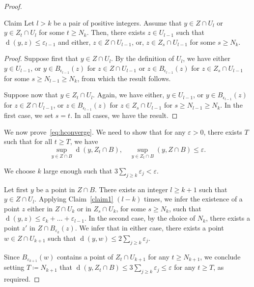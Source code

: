 \documentclass[AHL,Unicode,longabstracts]{cedram}
\DeclareMathOperator{\dist}{d}
\begin{document}
\begin{proof}
\begin{enonce}
{Claim } \label{claim1}
Let $l>k$ be a pair of positive integers. Assume that $y \in Z\cap U_l$ or $y\in Z_t \cap U_l$ for some $t \geq N_k$. Then, there exists $z \in U_{l-1}$ such that $\dist(y, z) \leq \varepsilon_{l-1}$ and either, $z \in Z \cap U_{l-1}$, or, $z \in Z_s \cap U_{l-1}$ for some $s\geq N_k$.
\end{enonce}

\begin{proof}
Suppose first that $y \in Z\cap U_l$. By the definition of $U_l$, we have either $y\in U_{l-1}$, or $y \in B_{\epsilon_{l-1}}(z)$ for $z\in Z\cap U_{l-1}$ or $z \in B_{\epsilon_{l-1}}(z)$ for $z \in Z_s\cap U_{l-1}$ for some $s\geq N_{l-1} \geq N_k$, from which the result follows.

Suppose now that $y \in Z_t\cap U_l$. Again, we have either, $y\in U_{l-1}$, or $y \in B_{\epsilon_{l-1}}(z)$ for $z\in Z\cap U_{l-1}$, or $z \in B_{\epsilon_{l-1}}(z)$ for $z \in Z_s\cap U_{l-1}$ for $s\geq N_{l-1} \geq N_k$. In the first case, we set $s=t$. In all cases, we have the result.
\end{proof}

We now prove~\eqref{eq:hconverge}. We need to show that for any $\varepsilon>0$, there exists $T$ such that for all $t \geq T$, we have
\[
\sup_{y\in Z\cap B} \dist(y, Z_t\cap B),\quad \sup_{y \in Z_t \cap B} (y, Z\cap B) \leq \varepsilon.
\]


We choose $k$ large enough such that $3\sum_{j \geq k}\varepsilon_{j} < \varepsilon$.

Let first $y$ be a point in $Z\cap B$. There exists an integer $l \geq k+1$ such that $y \in Z \cap U_l$. Applying Claim~\ref{claim1} $(l-k)$ times, we infer the existence of a point $z$ either in $Z \cap U_k$ or in $Z_s\cap U_k$, for some $s \geq N_k$, such that $\dist(y,z) \leq \varepsilon_{k}+ \dots + \varepsilon_{l-1}$. In the second case, by the choice of $N_k$, there exists a point $z'$ in $Z \cap B_{\varepsilon_k}(z)$. We infer that in either case, there exists a point $w \in Z\cap U_{k+1}$ such that $\dist(y,w) \leq 2 \sum_{j \geq k}\varepsilon_{j}$.

Since $B_{\varepsilon_{k+1}}(w)$ contains a point of $Z_t \cap U_{k+1}$ for any $t\geq N_{k+1}$, we conclude setting $T \coloneqq N_{k+1}$ that $\dist(y, Z_t \cap B) \leq 3\sum_{j \geq k}\varepsilon_{j} \leq \varepsilon$ for any $t \geq T$, as required.




\end{proof}
\end{document}
